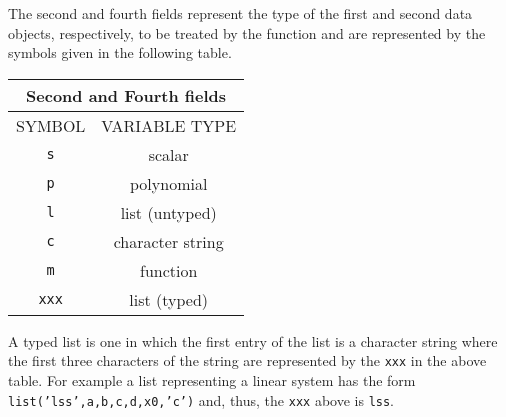 The second
and fourth fields represent the type of the first and second data objects,
respectively, 
to be treated by the function and are represented by the symbols given
in the following table.

\begin{center}
\begin{tabular}{|c|c|}
\hline  
\multicolumn{2}{|c|}{Second and Fourth fields}
\\ \hline \hline
SYMBOL & VARIABLE TYPE
\\ \hline \hline

\verb!s! & scalar  \\ \hline

\verb!p! & polynomial \\ \hline

\verb!l! & list (untyped)  \\ \hline

\verb!c! & character string   \\ \hline

\verb!m! & function \\ \hline

\verb!xxx! & list (typed)  \\ \hline 
\end{tabular}
\end{center}

A typed list is one in which the first
entry of the list is a character string where the first
three characters of the string are represented by the 
{\tt xxx} in the above table.  For example a list
representing a linear system has the form 
{\tt list('lss',a,b,c,d,x0,'c')} and, thus, the {\tt xxx}
above is {\tt lss}.


